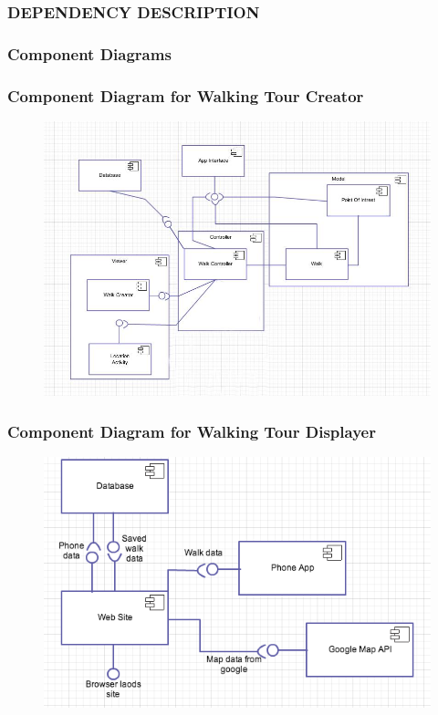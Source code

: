 \documentclass{project}
\begin{document}
\newpage


\subsubsection{DEPENDENCY DESCRIPTION}
\subsubsection{Component Diagrams}

\subsubsection{Component Diagram for Walking Tour Creator}
\begin{figure}[h] 

\includegraphics[width=15cm]{NewComponentDiagram.jpg}
\end{figure}

\newpage

\subsubsection{Component Diagram for Walking Tour Displayer}
\begin{figure}[h] 
    \includegraphics[width=15cm]{compontent_diagram_WTD.png}
\end{figure}
\end{document}
